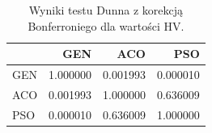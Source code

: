 \begin{table}
\caption{Wyniki testu Dunna z korekcją Bonferroniego dla wartości HV.}
\label{tab:dunn_global}
\begin{tabular}{lrrr}
\toprule
 & GEN & ACO & PSO \\
\midrule
GEN & 1.000000 & 0.001993 & 0.000010 \\
ACO & 0.001993 & 1.000000 & 0.636009 \\
PSO & 0.000010 & 0.636009 & 1.000000 \\
\bottomrule
\end{tabular}
\end{table}
